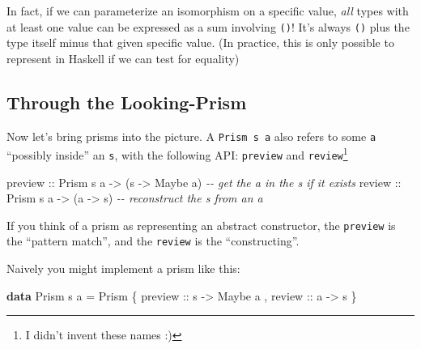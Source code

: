 \documentclass[]{article}
\newenvironment{Shaded}{}{}
\newcommand{\CommentTok}[1]{\textcolor[rgb]{0.38,0.63,0.69}{\textit{#1}}}
\newcommand{\DataTypeTok}[1]{\textcolor[rgb]{0.56,0.13,0.00}{#1}}
\newcommand{\KeywordTok}[1]{\textcolor[rgb]{0.00,0.44,0.13}{\textbf{#1}}}
\newcommand{\NormalTok}[1]{#1}
\newcommand{\OtherTok}[1]{\textcolor[rgb]{0.00,0.44,0.13}{#1}}
\begin{document}
In fact, if we can parameterize an isomorphism on a specific value, \emph{all}
types with at least one value can be expressed as a sum involving \texttt{()}!
It's always \texttt{()} plus the type itself minus that given specific value.
(In practice, this is only possible to represent in Haskell if we can test for
equality)

\hypertarget{through-the-looking-prism}{%
\subsection{Through the Looking-Prism}\label{through-the-looking-prism}}

Now let's bring prisms into the picture. A
\texttt{Prism\textquotesingle{}\ s\ a} also refers to some \texttt{a} ``possibly
inside'' an \texttt{s}, with the following API: \texttt{preview} and
\texttt{review}\footnote{I didn't invent these names :)}

\begin{Shaded}
\begin{Highlighting}[]
\OtherTok{preview ::} \DataTypeTok{Prism\textquotesingle{}}\NormalTok{ s a }\OtherTok{{-}>}\NormalTok{ (s }\OtherTok{{-}>} \DataTypeTok{Maybe}\NormalTok{ a)   }\CommentTok{{-}{-} get the \textquotesingle{}a\textquotesingle{} in the \textquotesingle{}s\textquotesingle{} if it exists}
\OtherTok{review  ::} \DataTypeTok{Prism\textquotesingle{}}\NormalTok{ s a }\OtherTok{{-}>}\NormalTok{ (a }\OtherTok{{-}>}\NormalTok{ s)         }\CommentTok{{-}{-} reconstruct the \textquotesingle{}s\textquotesingle{} from an \textquotesingle{}a\textquotesingle{}}
\end{Highlighting}
\end{Shaded}

If you think of a prism as representing an abstract constructor, the
\texttt{preview} is the ``pattern match'', and the \texttt{review} is the
``constructing''.

Naively you might implement a prism like this:

\begin{Shaded}
\begin{Highlighting}[]
\KeywordTok{data} \DataTypeTok{Prism\textquotesingle{}}\NormalTok{ s a }\OtherTok{=} \DataTypeTok{Prism\textquotesingle{}}
\NormalTok{    \{}\OtherTok{ preview ::}\NormalTok{ s }\OtherTok{{-}>} \DataTypeTok{Maybe}\NormalTok{ a}
\NormalTok{    ,}\OtherTok{ review  ::}\NormalTok{ a }\OtherTok{{-}>}\NormalTok{ s}
\NormalTok{    \}}
\end{Highlighting}
\end{Shaded}
\end{document}
